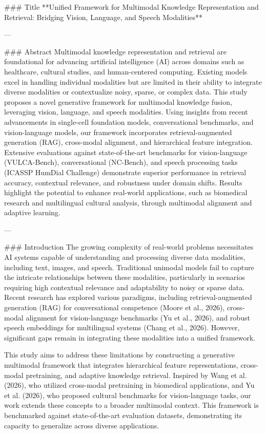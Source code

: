 ### Title
**Unified Framework for Multimodal Knowledge Representation and Retrieval: Bridging Vision, Language, and Speech Modalities**

---

### Abstract
Multimodal knowledge representation and retrieval are foundational for advancing artificial intelligence (AI) across domains such as healthcare, cultural studies, and human-centered computing. Existing models excel in handling individual modalities but are limited in their ability to integrate diverse modalities or contextualize noisy, sparse, or complex data. This study proposes a novel generative framework for multimodal knowledge fusion, leveraging vision, language, and speech modalities. Using insights from recent advancements in single-cell foundation models, conversational benchmarks, and vision-language models, our framework incorporates retrieval-augmented generation (RAG), cross-modal alignment, and hierarchical feature integration. Extensive evaluations against state-of-the-art benchmarks for vision-language (VULCA-Bench), conversational (NC-Bench), and speech processing tasks (ICASSP HumDial Challenge) demonstrate superior performance in retrieval accuracy, contextual relevance, and robustness under domain shifts. Results highlight the potential to enhance real-world applications, such as biomedical research and multilingual cultural analysis, through multimodal alignment and adaptive learning.  

---

### Introduction
The growing complexity of real-world problems necessitates AI systems capable of understanding and processing diverse data modalities, including text, images, and speech. Traditional unimodal models fail to capture the intricate relationships between these modalities, particularly in scenarios requiring high contextual relevance and adaptability to noisy or sparse data. Recent research has explored various paradigms, including retrieval-augmented generation (RAG) for conversational competence (Moore et al., 2026), cross-modal alignment for vision-language benchmarks (Yu et al., 2026), and robust speech embeddings for multilingual systems (Chang et al., 2026). However, significant gaps remain in integrating these modalities into a unified framework. 

This study aims to address these limitations by constructing a generative multimodal framework that integrates hierarchical feature representations, cross-modal pretraining, and adaptive knowledge retrieval. Inspired by Wang et al. (2026), who utilized cross-modal pretraining in biomedical applications, and Yu et al. (2026), who proposed cultural benchmarks for vision-language tasks, our work extends these concepts to a broader multimodal context. This framework is benchmarked against state-of-the-art evaluation datasets, demonstrating its capacity to generalize across diverse applications.

